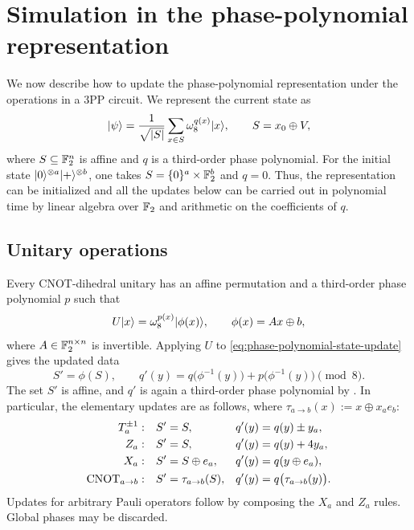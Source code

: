 \section{Simulation in the phase-polynomial representation}
\label{sec:simulator-phase-polynomial-representation}

We now describe how to update the phase-polynomial representation under the
operations in a 3PP circuit.  We represent the current state as
\begin{equation}
    \ket{\psi}
    = \frac{1}{\sqrt{|S|}}
      \sum_{x\in S}\omega_8^{q(x)}\ket{x},
    \qquad S=x_0\oplus V,
    \label{eq:phase-polynomial-state-update}
\end{equation}
where $S\subseteq\mathbb{F}_2^n$ is affine and $q$ is a third-order phase
polynomial.  For the initial state
$|0\rangle^{\otimes a}|+\rangle^{\otimes b}$, one takes
$S=\{0\}^a\times\mathbb{F}_2^b$ and $q=0$.
Thus, the representation can be initialized and all the updates below can be carried out in polynomial time by linear algebra over $\mathbb{F}_2$ and arithmetic on the coefficients of $q$.

\subsection{Unitary operations}

Every CNOT-dihedral unitary has an affine permutation and a third-order
phase polynomial $p$ such that
\begin{equation}
    U\ket{x}=\omega_8^{p(x)}\ket{\phi(x)},
    \qquad \phi(x)=Ax\oplus b,
    \label{eq:cnot-dihedral-action}
\end{equation}
where $A\in\mathbb{F}_2^{n\times n}$ is invertible.  Applying $U$ to
\cref{eq:phase-polynomial-state-update} gives the updated data
\begin{equation}
    S'=\phi(S),
    \qquad
    q'(y)=q\bigl(\phi^{-1}(y)\bigr)
           +p\bigl(\phi^{-1}(y)\bigr)\pmod 8.
    \label{eq:phase-polynomial-unitary-update}
\end{equation}
The set $S'$ is affine, and $q'$ is again a third-order phase polynomial by
.  In particular, the elementary
updates are as follows, where
$\tau_{a\to b}(x):=x\oplus x_a e_b$:
\begin{align}
    T_a^{\pm1}:&\quad
        S'=S,
        &q'(y)&=q(y)\pm y_a, \\
    Z_a:&\quad
        S'=S,
        &q'(y)&=q(y)+4y_a, \\
    X_a:&\quad
        S'=S\oplus e_a,
        &q'(y)&=q(y\oplus e_a), \\
    \operatorname{CNOT}_{a\to b}:&\quad
        S'=\tau_{a\to b}(S),
        &q'(y)&=q\bigl(\tau_{a\to b}(y)\bigr).
\end{align}
Updates for arbitrary Pauli operators follow by composing the $X_a$ and
$Z_a$ rules. Global phases may be discarded.

